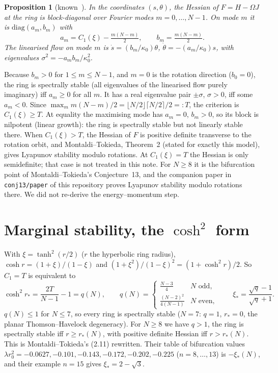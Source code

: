 \documentclass[11pt]{article}
\newtheorem{proposition}[theorem]{Proposition}
\theoremstyle{remark}
\begin{document}
\begin{proposition}[known~\cite{MT}]\label{prop:modes}
In the coordinates $(s,\theta)$, the Hessian of $F=H-\Omega J$ at the ring is block-diagonal over Fourier
modes $m=0,\dots,N-1$. On mode $m$ it is $\mathrm{diag}(a_m,b_m)$ with
\[
a_m=C_1(\xi)-\tfrac{m(N-m)}{2},\qquad b_m=\tfrac{m(N-m)}{2}.
\]
The linearised flow on mode $m$ is $\dot s=(b_m/\kappa_0)\theta$, $\dot\theta=-(a_m/\kappa_0)s$, with
eigenvalues $\sigma^2=-a_mb_m/\kappa_0^2$.
\end{proposition}
Because $b_m>0$ for $1\le m\le N-1$, and $m=0$ is the rotation direction ($b_0=0$), the ring is spectrally
stable (all eigenvalues of the linearised flow purely imaginary) iff $a_m\ge0$ for all $m$. It has a real
eigenvalue pair $\pm\sigma$, $\sigma>0$, iff some $a_m<0$. Since
$\max_m m(N-m)/2=\lfloor N/2\rfloor\lceil N/2\rceil/2=:T$, the criterion is $C_1(\xi)\ge T$. At equality the
maximising mode has $a_m=0$, $b_m>0$, so its block is nilpotent (linear growth): the ring is spectrally stable but not
linearly stable there. When
$C_1(\xi)>T$, the Hessian of $F$ is positive definite transverse to the rotation orbit, and
Montaldi--Tokieda, Theorem~2 (stated for exactly this model), gives Lyapunov stability modulo rotations. At
$C_1(\xi)=T$ the Hessian is only semidefinite; that case is not treated in this note. For $N\ge8$ it is the
bifurcation point of Montaldi--Tokieda's Conjecture~13, and the companion paper in \texttt{conj13/paper} of this
repository proves Lyapunov stability modulo rotations there. We did not
re-derive the energy--momentum step.

\section{Marginal stability, the $\cosh^2$ form}
With $\xi=\tanh^2(r/2)$ ($r$ the hyperbolic ring radius), $\cosh r=(1+\xi)/(1-\xi)$ and
$(1+\xi^2)/(1-\xi)^2=(1+\cosh^2r)/2$. So $C_1=T$ is equivalent to
\[
\cosh^2r_*=\frac{2T}{N-1}-1=q(N),\qquad
q(N)=\begin{cases}\frac{N-3}{4}&N\text{ odd},\\[2pt] \frac{(N-2)^2}{4(N-1)}&N\text{ even},\end{cases}
\qquad \xi_*=\frac{\sqrt q-1}{\sqrt q+1}.
\]
$q(N)\le1$ for $N\le7$, so every ring is spectrally stable ($N=7$: $q=1$, $r_*=0$, the planar Thomson--Havelock
degeneracy). For $N\ge8$ we have $q>1$, the ring is spectrally stable iff $r\ge r_*(N)$, with positive definite Hessian iff $r>r_*(N)$. This is
Montaldi--Tokieda's (2.11) rewritten. Their table of bifurcation values $\lambda r_0^2=-0.0627,-0.101,
-0.143,-0.172,-0.202,-0.225$ ($n=8,\dots,13$) is $-\xi_*(N)$, and their example $n=15$ gives $\xi_*=2-\sqrt3$.
\end{document}
